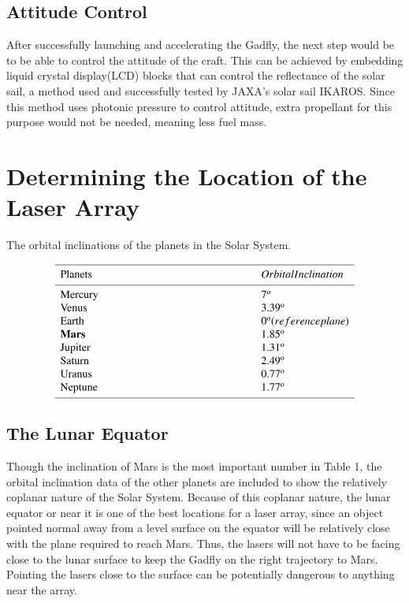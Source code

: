 \documentclass{aa}
\begin{document}
\subsection{Attitude Control}
After successfully launching and accelerating the Gadfly, the next step would be to be able to control the attitude of the craft. This can be achieved by embedding liquid crystal display(LCD) blocks that can control the reflectance of the solar sail, a method used and successfully tested by JAXA's solar sail IKAROS. Since this method uses photonic pressure to control attitude, extra propellant for this purpose would not be needed, meaning less fuel mass.
\section{Determining the Location of the Laser Array}
\begin{table}[h!]
      \caption[]{The orbital inclinations of the planets in the Solar System. }
         \label{KapSou}
     $$ 
         \begin{array}{p{0.5\linewidth}l}
            \hline
            \noalign{\smallskip}
            Planets     &  Orbital Inclination\\
            \noalign{\smallskip}
            \hline
            \noalign{\smallskip}
            Mercury     & 7^{\mathrm{o}}           \\
            Venus     & 3.39^{\mathrm{o}}           \\
            Earth &  0^{\mathrm{o}} (reference plane)     \\
%
          	\textbf{Mars}           & 1.85^{\mathrm{o}} \\
Jupiter     & 1.31^{\mathrm{o}}           \\     
Saturn     & 2.49^{\mathrm{o}}           \\
Uranus     & 0.77^{\mathrm{o}}           \\
Neptune    & 1.77^{\mathrm{o}}           \\
            \noalign{\smallskip}
            \hline
         \end{array}
     $$ 
   \end{table}
\subsection{The Lunar Equator}
Though the inclination of Mars is the most important number in Table 1, the orbital inclination data of the other planets are included to show the relatively coplanar nature of the Solar System.  Because of this coplanar nature, the lunar equator or near it is one of the best locations for a laser array, since an object pointed normal away from a level surface on the equator will be relatively close with the plane required to reach Mars. Thus, the lasers will not have to be facing close to the lunar surface to keep the Gadfly on the right trajectory to Mars. Pointing the lasers close to the surface can be potentially dangerous to anything near the array.
\end{document}
